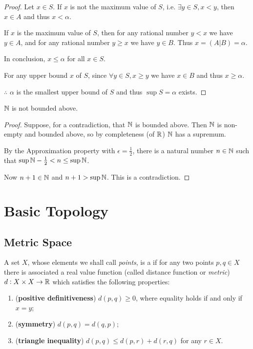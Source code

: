 \begin{proof}
Let $x \in S$. 
If $x$ is not the maximum value of $S$, i.e. $\exists y \in S,x<y$, then $x \in A$ and thus $x<\alpha$.

If $x$ is the maximum value of $S$, then for any rational number $y<x$ we have $y \in A$, and for any rational number $y \ge x$ we have $y \in B$.
Thus $x=(A|B)=\alpha$.

In conclusion, $x \le \alpha$ for all $x \in S$.

For any upper bound $x$ of $S$, since $\forall y \in S, x \ge y$ we have $x \in B$ and thus $x \ge \alpha$.

$\therefore$ $\alpha$ is the smallest upper bound of $S$ and thus $\sup S = \alpha$ exists.
\end{proof}

\begin{theorem}
$\mathbb N$ is not bounded above.
\end{theorem}
\begin{proof}
Suppose, for a contradiction, that $\mathbb N$ is bounded above. Then $\mathbb N$ is non-empty and bounded above, so by completeness (of $\mathbb R$) $\mathbb N$ has a supremum.

By the Approximation property with $\epsilon=\frac{1}{2}$, there is a natural number $n\in\mathbb N$ such that $\sup\mathbb N-\frac{1}{2}<n\le\sup\mathbb N$.

Now $n+1\in\mathbb N$ and $n+1>\sup\mathbb N$. This is a contradiction.
\end{proof}

\chapter{Basic Topology}
\section{Metric Space}
\begin{definition}
A set $X$, whose elements we shall call \emph{points}, is a  if for any two points $p,q\in X$ there is associated a real value function (called distance function or \emph{metric}) $d:X\times X\to\mathbb R$ which satisfies the following properties:
\begin{enumerate}[label=(\roman*)]
\item (\textbf{positive definitiveness}) $d(p,q)\ge0$, where equality holds if and only if $x=y$;
\item (\textbf{symmetry}) $d(p,q)=d(q,p)$;
\item (\textbf{triangle inequality}) $d(p,q)\le d(p,r)+d(r,q)$ for any $r\in X$.
\end{enumerate}
\end{definition}

